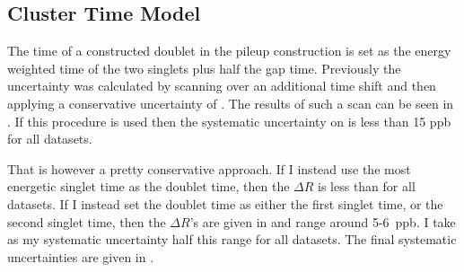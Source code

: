 \clearpage
\subsection{Cluster Time Model}

The time of a constructed doublet in the pileup construction is set as the energy weighted time of the two singlets plus half the gap time. Previously the uncertainty was calculated by scanning over an additional time shift and then applying a conservative uncertainty of . The results of such a scan can be seen in . If this procedure is used then the systematic uncertainty on \R is less than 15 ppb for all datasets.

That is however a pretty conservative approach. If I instead use the most energetic singlet time as the doublet time, then the $\Delta R$ is less than  for all datasets. If I instead set the doublet time as either the first singlet time, or the second singlet time, then the $\Delta R$'s are given in  and range around 5-6~ppb. I take as my systematic uncertainty half this range for all datasets. The final systematic uncertainties are given in .



